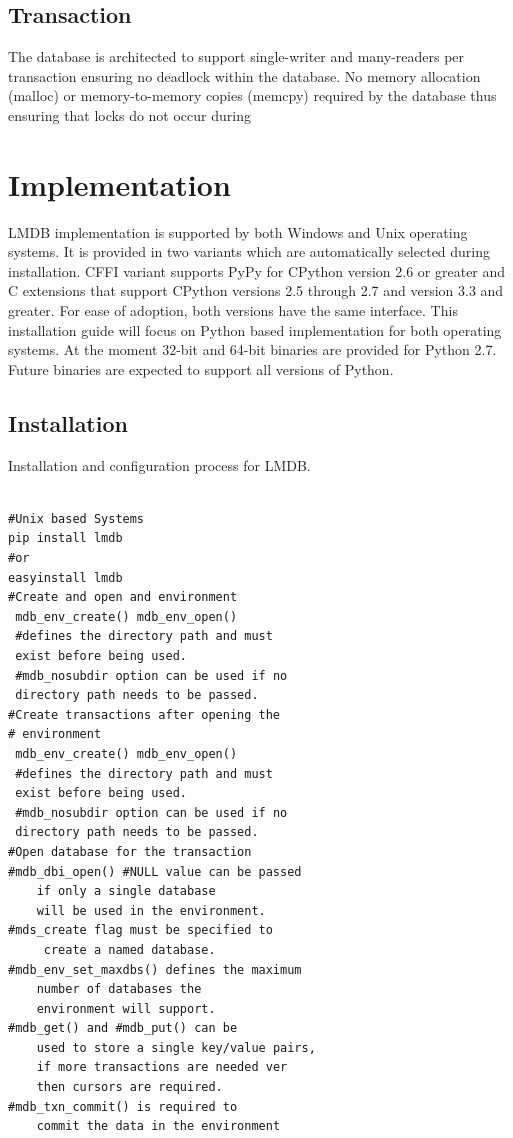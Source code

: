 \documentclass[9pt,twocolumn,twoside]{../../styles/osajnl}
\begin{document}
\subsection{Transaction}

The database is architected to support single-writer and many-readers
per transaction \cite{www-lmdbdoc} ensuring no deadlock within the
database. No memory allocation (malloc) or memory-to-memory copies
(memcpy) required by the database thus ensuring that locks do not
occur during

\section{Implementation}

LMDB implementation is supported by both Windows and Unix operating
systems. It is provided in two variants which are automatically
selected during installation. CFFI variant supports PyPy for CPython
version 2.6 or greater and C extensions that support CPython versions
2.5 through 2.7 and version 3.3 and greater. For ease of adoption,
both versions have the same interface. This installation guide will
focus on Python based implementation for both operating systems.  At
the moment 32-bit and 64-bit binaries are provided for Python
2.7. Future binaries are expected to support all versions of Python.

\subsection{Installation}

Installation and configuration process for LMDB.

\begin{verbatim}

#Unix based Systems
pip install lmdb
#or
easyinstall lmdb
#Create and open and environment   
 mdb_env_create() mdb_env_open() 
 #defines the directory path and must
 exist before being used.  
 #mdb_nosubdir option can be used if no
 directory path needs to be passed. 
#Create transactions after opening the 
# environment
 mdb_env_create() mdb_env_open() 
 #defines the directory path and must
 exist before being used.  
 #mdb_nosubdir option can be used if no
 directory path needs to be passed. 
#Open database for the transaction
#mdb_dbi_open() #NULL value can be passed 
    if only a single database
    will be used in the environment. 
#mds_create flag must be specified to
     create a named database. 
#mdb_env_set_maxdbs() defines the maximum 
    number of databases the
    environment will support.
#mdb_get() and #mdb_put() can be 
    used to store a single key/value pairs,
    if more transactions are needed ver
    then cursors are required. 
#mdb_txn_commit() is required to 
    commit the data in the environment

\end{verbatim}
\end{document}
